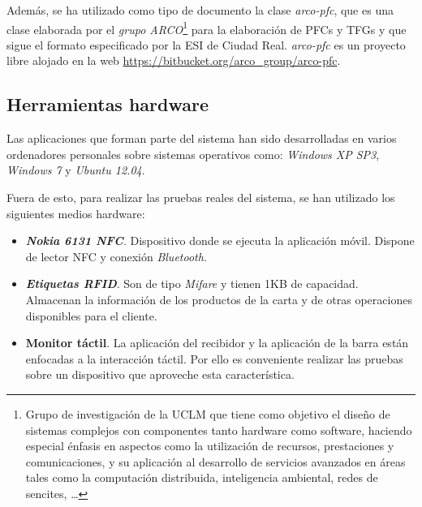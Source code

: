   Además, se ha utilizado como tipo de documento la clase \emph{arco-pfc}, que
  es una clase elaborada por el \emph{grupo \acs{ARCO}}\footnote{Grupo de
  investigación de la \acs{UCLM} que tiene como objetivo el diseño de
  sistemas complejos con componentes tanto hardware como software, haciendo
  especial énfasis en aspectos como la utilización de recursos, prestaciones
  y comunicaciones, y su aplicación al desarrollo de servicios avanzados en
  áreas tales como la computación distribuida, inteligencia ambiental, redes
  de sencites, \dots\cite{bib:ARCO}} para la elaboración de \acs{PFC}s y
  \acs{TFG}s y que sigue el formato especificado por la \acs{ESI} de Ciudad 
  Real. \emph{arco-pfc} es un proyecto libre alojado en la web
  \url{https://bitbucket.org/arco_group/arco-pfc}.

  \subsection{Herramientas hardware}
  Las aplicaciones que forman parte del sistema han sido desarrolladas en
  varios ordenadores personales sobre sistemas operativos como: \emph{Windows
  XP SP3}, \emph{Windows 7} y \emph{Ubuntu 12.04}.

  Fuera de esto, para realizar las pruebas reales del sistema, se han utilizado
  los siguientes medios hardware:
  \begin{itemize}
  \item \textbf{\emph{Nokia 6131 \acs{NFC}}}. Dispositivo donde se ejecuta
  la aplicación móvil. Dispone de lector \acs{NFC} y conexión \emph{Bluetooth}.
  \item \textbf{\emph{Etiquetas \acs{RFID}}}. Son de tipo \emph{Mifare} y
  tienen 1KB de capacidad. Almacenan la información de los productos de la 
  carta y de otras operaciones disponibles para el cliente.
  \item \textbf{Monitor táctil}. La aplicación del recibidor y la aplicación
  de la barra están enfocadas a la interacción táctil. Por ello es conveniente
  realizar las pruebas sobre un dispositivo que aproveche esta característica.
  \end{itemize}

